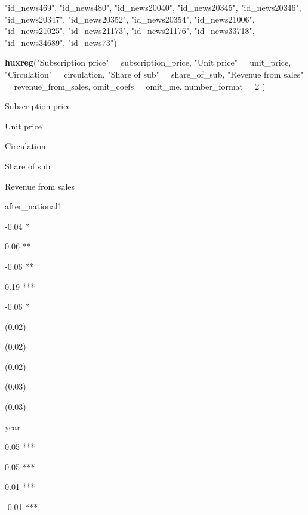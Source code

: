 \documentclass[
]{book}
\newenvironment{Shaded}{\begin{snugshade}}{\end{snugshade}}
\newcommand{\DataTypeTok}[1]{\textcolor[rgb]{0.13,0.29,0.53}{#1}}
\newcommand{\DecValTok}[1]{\textcolor[rgb]{0.00,0.00,0.81}{#1}}
\newcommand{\KeywordTok}[1]{\textcolor[rgb]{0.13,0.29,0.53}{\textbf{#1}}}
\newcommand{\NormalTok}[1]{#1}
\newcommand{\StringTok}[1]{\textcolor[rgb]{0.31,0.60,0.02}{#1}}
\begin{document}
\begin{Shaded}
\begin{Highlighting}[]
             \StringTok{"id_news469"}\NormalTok{, }\StringTok{"id_news480"}\NormalTok{, }\StringTok{"id_news20040"}\NormalTok{, }\StringTok{"id_news20345"}\NormalTok{, }
             \StringTok{"id_news20346"}\NormalTok{, }\StringTok{"id_news20347"}\NormalTok{, }\StringTok{"id_news20352"}\NormalTok{, }\StringTok{"id_news20354"}\NormalTok{, }
             \StringTok{"id_news21006"}\NormalTok{, }\StringTok{"id_news21025"}\NormalTok{, }\StringTok{"id_news21173"}\NormalTok{, }\StringTok{"id_news21176"}\NormalTok{, }
             \StringTok{"id_news33718"}\NormalTok{, }\StringTok{"id_news34689"}\NormalTok{, }\StringTok{"id_news73"}\NormalTok{)}

\KeywordTok{huxreg}\NormalTok{(}\StringTok{"Subscription price"}\NormalTok{ =}\StringTok{ }\NormalTok{subscription_price, }
       \StringTok{"Unit price"}\NormalTok{ =}\StringTok{ }\NormalTok{unit_price, }
       \StringTok{"Circulation"}\NormalTok{ =}\StringTok{ }\NormalTok{circulation, }
       \StringTok{"Share of sub"}\NormalTok{ =}\StringTok{ }\NormalTok{share_of_sub,}
       \StringTok{"Revenue from sales"}\NormalTok{ =}\StringTok{ }\NormalTok{revenue_from_sales,}
       \DataTypeTok{omit_coefs =}\NormalTok{ omit_me, }
       \DataTypeTok{number_format =} \DecValTok{2}
\NormalTok{       )}
\end{Highlighting}
\end{Shaded}

\label{tab:unnamed-chunk-384}

Subscription price

Unit price

Circulation

Share of sub

Revenue from sales

after\_national1

-0.04 *~~

0.06 **~

-0.06 **~

0.19 ***

-0.06 *~~

(0.02)~~~

(0.02)~~~

(0.02)~~~

(0.03)~~~

(0.03)~~~

year

0.05 ***

0.05 ***

0.01 ***

-0.01 ***
\end{document}
